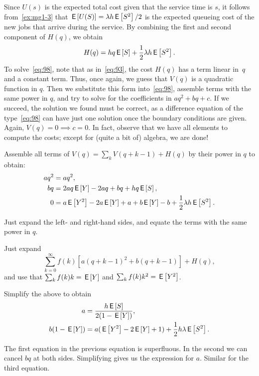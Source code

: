 \documentclass[companion]{subfiles}
\begin{document}
Since $U(s)$ is the expected total cost given that the service time is $s$, it follows from~\cref{ex:mg1-3} that $\,\mathsf{E}\left[U(S)\right] =  \lambda h \,\mathsf{E}\left[S^2\right]/2$ is the expected queueing cost of the new jobs that arrive during the service.
By combining the first and second component of $H(q)$, we obtain
\begin{equation*}
  H(q) = h q \,\mathsf{E}\left[S\right] + \frac 12 \lambda h \,\mathsf{E}\left[S^2\right].
\end{equation*}
To solve~\cref{eq:98}, note that as in~\cref{eq:93}, the cost $H(q)$ has a term linear in~$q$ and a constant term.
Thus, once again, we guess that $V(q)$ is a quadratic function in $q$.
Then we substitute this form into~\cref{eq:98}, assemble terms with the same power in $q$, and try to solve for the coefficients in $aq^2 + bq+c$.
If we succeed, the solution we found must be correct, as a difference equation of the type~\cref{eq:98} can have just one solution once the boundary conditions are given.
Again, $V(q)=0 \implies c = 0$.
In fact, observe that we have all elements to compute the costs; except for (quite a bit of) algebra, we are done!

\begin{extra}
Assemble all terms of $V(q) = \sum_k V(q+k-1) + H(q)$ by their power in $q$ to obtain:
\begin{align*}
  a q^2 &= a q^2, \\
  b q &= 2a q \,\mathsf{E}\left[Y\right] - 2a q + b q + h q \,\mathsf{E}\left[S\right],\\
  0 &= a \,\mathsf{E}\left[Y^2\right] - 2a \,\mathsf{E}\left[Y\right] + a + b \,\mathsf{E}\left[Y\right] - b + \frac 12 \lambda h \,\mathsf{E}\left[S^2\right].
\end{align*}
\begin{hint}
  Just expand the left- and right-hand sides, and equate the terms with the same power in $q$.
\end{hint}
\begin{solution}
  Just expand
  \begin{equation*}
    \sum_{k=0}^\infty f(k)[ a(q+k-1)^2 + b(q+k-1)] + H(q),
  \end{equation*}
  and use that $\sum_k f(k) k = \,\mathsf{E}\left[Y\right]$ and $\sum_k f(k) k^2 = \,\mathsf{E}\left[Y^2\right]$. 
\end{solution}
\end{extra}

\begin{extra}
Simplify the above to obtain
\begin{align*}
  a &= \frac{h \,\mathsf{E}\left[S\right]}{2(1-\,\mathsf{E}\left[Y\right])}, \\
  b(1-\,\mathsf{E}\left[Y\right]) &= a(\,\mathsf{E}\left[Y^2\right] - 2 \,\mathsf{E}\left[Y\right] + 1) + \frac 12 h \lambda \,\mathsf{E}\left[S^2\right].
\end{align*}
\begin{solution}
  The first equation in the previous equation is superfluous.
  In the second we can cancel $bq$ at both sides.
  Simplifying gives us the expression for $a$.
  Similar for the third equation.
\end{solution}
\end{extra}
\end{document}
